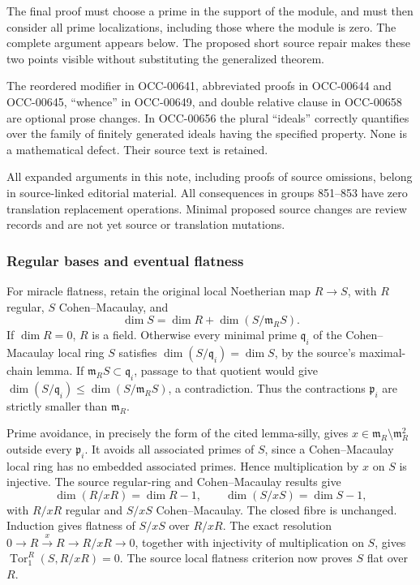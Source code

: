 The final proof must choose a prime in the support of the module, and must then consider all prime localizations, including those where the module is zero. The complete argument appears below. The proposed short source repair makes these two points visible without substituting the generalized theorem.

The reordered modifier in OCC-00641, abbreviated proofs in OCC-00644 and OCC-00645, ``whence'' in OCC-00649, and double relative clause in OCC-00658 are optional prose changes. In OCC-00656 the plural ``ideals'' correctly quantifies over the family of finitely generated ideals having the specified property. None is a mathematical defect. Their source text is retained.

All expanded arguments in this note, including proofs of source omissions, belong in source-linked editorial material. All consequences in groups 851--853 have zero translation replacement operations. Minimal proposed source changes are review records and are not yet source or translation mutations.

\subsubsection{Regular bases and eventual flatness}\label{regular-bases-and-eventual-flatness}

For miracle flatness, retain the original local Noetherian map \(R\to S\), with \(R\) regular, \(S\) Cohen--Macaulay, and \[
\dim S=\dim R+\dim(S/\mathfrak m_RS).
\] If \(\dim R=0\), \(R\) is a field. Otherwise every minimal prime \(\mathfrak q_i\) of the Cohen--Macaulay local ring \(S\) satisfies \(\dim(S/\mathfrak q_i)=\dim S\), by the source's maximal-chain lemma. If \(\mathfrak m_RS\subset\mathfrak q_i\), passage to that quotient would give \(\dim(S/\mathfrak q_i)\leq\dim(S/\mathfrak m_RS)\), a contradiction. Thus the contractions \(\mathfrak p_i\) are strictly smaller than \(\mathfrak m_R\).

Prime avoidance, in precisely the form of the cited lemma-silly, gives \(x\in\mathfrak m_R\setminus\mathfrak m_R^2\) outside every \(\mathfrak p_i\). It avoids all associated primes of \(S\), since a Cohen--Macaulay local ring has no embedded associated primes. Hence multiplication by \(x\) on \(S\) is injective. The source regular-ring and Cohen--Macaulay results give \[
\dim(R/xR)=\dim R-1,\qquad
\dim(S/xS)=\dim S-1,
\] with \(R/xR\) regular and \(S/xS\) Cohen--Macaulay. The closed fibre is unchanged. Induction gives flatness of \(S/xS\) over \(R/xR\). The exact resolution \(0\to R\xrightarrow{x}R\to R/xR\to0\), together with injectivity of multiplication on \(S\), gives \(\operatorname{Tor}_1^R(S,R/xR)=0\). The source local flatness criterion now proves \(S\) flat over \(R\).

